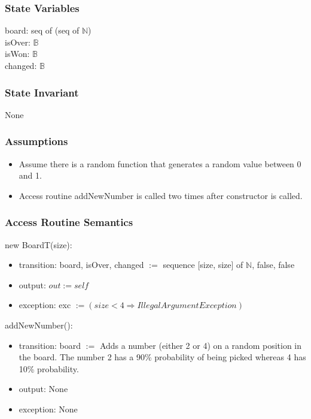 \documentclass[12pt]{article}
\begin{document}
\subsubsection* {State Variables}

board: seq of (seq of $\mathbb{N}$) \\
isOver: $\mathbb{B}$ \\
isWon: $\mathbb{B}$ \\
changed: $\mathbb{B}$

\subsubsection* {State Invariant}
None

\subsubsection* {Assumptions}
\begin{itemize}
  \item Assume there is a random function that generates a random value between 0 and 1.
  \item Access routine addNewNumber is called two times after constructor is called.
\end{itemize}

\subsubsection* {Access Routine Semantics}

new BoardT(size):
\begin{itemize}
    \item transition: board, isOver, changed $:=$ sequence [size, size] of $\mathbb{N}$, false, false
    \item output: $out := \mathit{self}$
    \item exception: exc $:= (size < 4 \Rightarrow IllegalArgumentException)$
\end{itemize}

\noindent addNewNumber():
\begin{itemize}
    \item transition: board $:=$ Adds a number (either 2 or 4) on a random position in the board. The number 2 has a 90\% probability of being picked whereas 4 has 10\% probability.
    \item output: None
    \item exception: None
\end{itemize}
\end{document}
